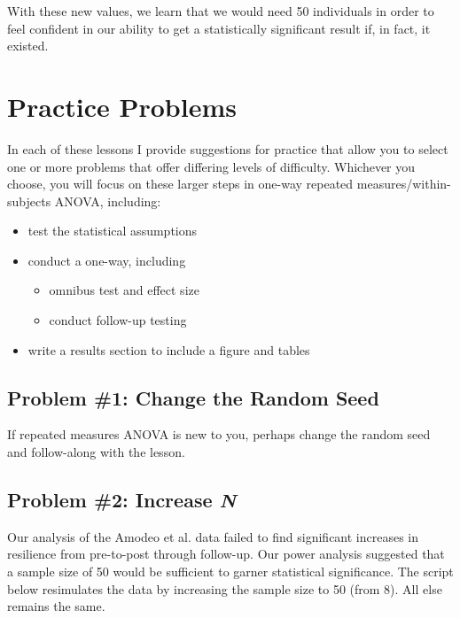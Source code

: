 \documentclass[
  11pt,
]{book}
\providecommand{\tightlist}{%
  \setlength{\itemsep}{0pt}\setlength{\parskip}{0pt}}
\begin{document}
With these new values, we learn that we would need 50 individuals in order to feel confident in our ability to get a statistically significant result if, in fact, it existed.

\hypertarget{practice-problems-6}{%
\section{Practice Problems}\label{practice-problems-6}}

In each of these lessons I provide suggestions for practice that allow you to select one or more problems that offer differing levels of difficulty. Whichever you choose, you will focus on these larger steps in one-way repeated measures/within-subjects ANOVA, including:

\begin{itemize}
\tightlist
\item
  test the statistical assumptions
\item
  conduct a one-way, including

  \begin{itemize}
  \tightlist
  \item
    omnibus test and effect size
  \item
    conduct follow-up testing
  \end{itemize}
\item
  write a results section to include a figure and tables
\end{itemize}

\hypertarget{problem-1-change-the-random-seed-1}{%
\subsection{Problem \#1: Change the Random Seed}\label{problem-1-change-the-random-seed-1}}

If repeated measures ANOVA is new to you, perhaps change the random seed and follow-along with the lesson.

\hypertarget{problem-2-increase-n}{%
\subsection{\texorpdfstring{Problem \#2: Increase \emph{N}}{Problem \#2: Increase N}}\label{problem-2-increase-n}}

Our analysis of the Amodeo et al. \citep{amodeo_empowering_2018} data failed to find significant increases in resilience from pre-to-post through follow-up. Our power analysis suggested that a sample size of 50 would be sufficient to garner statistical significance. The script below resimulates the data by increasing the sample size to 50 (from 8). All else remains the same.
\end{document}
